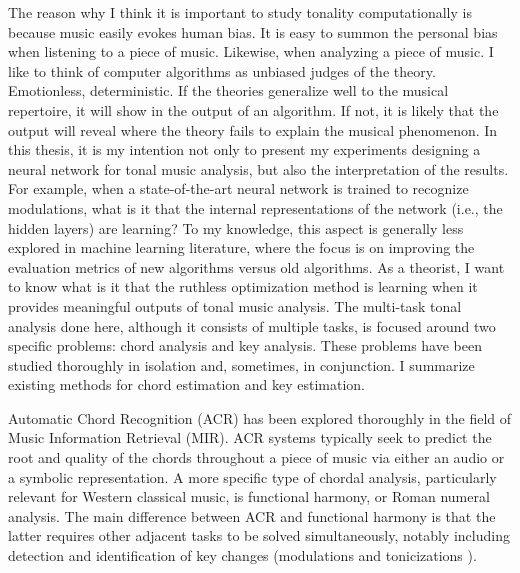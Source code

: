 The reason why I think it is important to study tonality computationally is because music easily evokes human bias.
It is easy to summon the personal bias when listening to a piece of music.
Likewise, when analyzing a piece of music.
I like to think of computer algorithms as unbiased judges of the theory. Emotionless, deterministic.
If the theories generalize well to the musical repertoire, it will show in the output of an algorithm.
If not, it is likely that the output will reveal where the theory fails to explain the musical phenomenon.
In this thesis, it is my intention not only to present my experiments designing a neural network for tonal music analysis, but also the interpretation of the results.
For example, when a state-of-the-art neural network is trained to recognize modulations, what is it that the internal representations of the network (i.e., the hidden layers) are learning?
To my knowledge, this aspect is generally less explored in machine learning literature, where the focus is on improving the evaluation metrics of new algorithms versus old algorithms.
As a theorist, I want to know what is it that the ruthless optimization method is learning when it provides meaningful outputs of tonal music analysis.
The multi-task tonal analysis done here, although it consists of multiple tasks, is focused around two specific problems: chord analysis and key analysis.
These problems have been studied thoroughly in isolation and, sometimes, in conjunction.
I summarize existing methods for chord estimation and key estimation.


Automatic Chord Recognition (ACR) has been explored thoroughly in the field of Music Information Retrieval (MIR). 
ACR systems typically seek to predict the root and quality of the chords throughout a piece of music via either an audio or a symbolic representation.
A more specific type of chordal analysis, particularly relevant for Western classical music, is functional harmony, or Roman numeral analysis. 
The main difference between ACR and functional harmony is that the latter requires other adjacent tasks to be solved simultaneously, notably including detection and identification of key changes (modulations \cite{feisthauer_estimating_2020, schreiber_local_2020} and tonicizations \cite{napoles_lopez_local_2020}).


